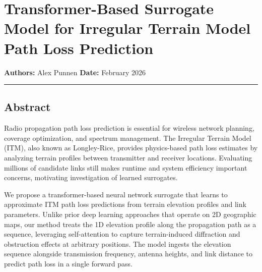 \documentclass[
]{article}
\author{}
\date{}
\begin{document}
\section{Transformer-Based Surrogate Model for Irregular Terrain Model
Path Loss
Prediction}\label{transformer-based-surrogate-model-for-irregular-terrain-model-path-loss-prediction}

\textbf{Authors:} Alex Punnen \textbf{Date:} February 2026


\begin{center}\rule{0.5\linewidth}{0.5pt}\end{center}

\subsection{Abstract}\label{abstract}

Radio propagation path loss prediction is essential for wireless network
planning, coverage optimization, and spectrum management. The Irregular
Terrain Model (ITM), also known as Longley-Rice, provides physics-based
path loss estimates by analyzing terrain profiles between transmitter
and receiver locations. Evaluating millions of candidate links still
makes runtime and system efficiency important concerns, motivating
investigation of learned surrogates.

We propose a transformer-based neural network surrogate that learns to
approximate ITM path loss predictions from terrain elevation profiles
and link parameters. Unlike prior deep learning approaches that operate
on 2D geographic maps, our method treats the 1D elevation profile along
the propagation path as a sequence, leveraging self-attention to capture
terrain-induced diffraction and obstruction effects at arbitrary
positions. The model ingests the elevation sequence alongside
transmission frequency, antenna heights, and link distance to predict
path loss in a single forward pass.
\end{document}
